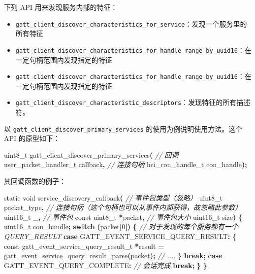 \documentclass[
  12pt,
]{book}
\newenvironment{Shaded}{\begin{snugshade}}{\end{snugshade}}
\newcommand{\CommentTok}[1]{\textcolor[rgb]{0.56,0.35,0.01}{\textit{#1}}}
\newcommand{\ControlFlowTok}[1]{\textcolor[rgb]{0.13,0.29,0.53}{\textbf{#1}}}
\newcommand{\DataTypeTok}[1]{\textcolor[rgb]{0.13,0.29,0.53}{#1}}
\newcommand{\DecValTok}[1]{\textcolor[rgb]{0.00,0.00,0.81}{#1}}
\newcommand{\NormalTok}[1]{#1}
\newcommand{\OperatorTok}[1]{\textcolor[rgb]{0.81,0.36,0.00}{\textbf{#1}}}
\begin{document}
下列 API 用来发现服务内部的特征：

\begin{itemize}
\item
  \texttt{gatt\_client\_discover\_characteristics\_for\_service}：发现一个服务里的所有特征
\item
  \texttt{gatt\_client\_discover\_characteristics\_for\_handle\_range\_by\_uuid16}：在一定句柄范围内发现指定的特征
\item
  \texttt{gatt\_client\_discover\_characteristics\_for\_handle\_range\_by\_uuid16}：在一定句柄范围内发现指定的特征
\item
  \texttt{gatt\_client\_discover\_characteristic\_descriptors}：发现特征的所有描述符。
\end{itemize}

以 \texttt{gatt\_client\_discover\_primary\_services} 的使用为例说明使用方法。这个 API 的原型如下：

\begin{Shaded}
\begin{Highlighting}[]
\DataTypeTok{uint8\_t}\NormalTok{ gatt\_client\_discover\_primary\_services}\OperatorTok{(}
  \CommentTok{// 回调}
\NormalTok{  user\_packet\_handler\_t callback}\OperatorTok{,}
  \CommentTok{// 连接句柄}
\NormalTok{  hci\_con\_handle\_t con\_handle}\OperatorTok{);}
\end{Highlighting}
\end{Shaded}

其回调函数的例子：

\begin{Shaded}
\begin{Highlighting}[]
\DataTypeTok{static} \DataTypeTok{void}\NormalTok{ service\_discovery\_callback}\OperatorTok{(}
  \CommentTok{// 事件包类型（忽略）}
  \DataTypeTok{uint8\_t}\NormalTok{ packet\_type}\OperatorTok{,}
  \CommentTok{// 连接句柄（这个句柄也可以从事件内部获得，故忽略此参数）}
  \DataTypeTok{uint16\_t}\NormalTok{ \_}\OperatorTok{,}
  \CommentTok{// 事件包}
  \DataTypeTok{const} \DataTypeTok{uint8\_t} \OperatorTok{*}\NormalTok{packet}\OperatorTok{,}
  \CommentTok{// 事件包大小}
  \DataTypeTok{uint16\_t}\NormalTok{ size}\OperatorTok{)}
\OperatorTok{\{}
    \DataTypeTok{uint16\_t}\NormalTok{ con\_handle}\OperatorTok{;}
    \ControlFlowTok{switch} \OperatorTok{(}\NormalTok{packet}\OperatorTok{[}\DecValTok{0}\OperatorTok{])}
    \OperatorTok{\{}
    \CommentTok{// 对于发现的每个服务都有一个 QUERY\_RESULT}
    \ControlFlowTok{case}\NormalTok{ GATT\_EVENT\_SERVICE\_QUERY\_RESULT}\OperatorTok{:}
        \OperatorTok{\{}
            \DataTypeTok{const}\NormalTok{ gatt\_event\_service\_query\_result\_t }\OperatorTok{*}\NormalTok{result }\OperatorTok{=}
\NormalTok{                gatt\_event\_service\_query\_result\_parse}\OperatorTok{(}\NormalTok{packet}\OperatorTok{);}
            \CommentTok{// ....}
        \OperatorTok{\}}
        \ControlFlowTok{break}\OperatorTok{;}
    \ControlFlowTok{case}\NormalTok{ GATT\_EVENT\_QUERY\_COMPLETE}\OperatorTok{:}
        \CommentTok{// 会话完成}
        \ControlFlowTok{break}\OperatorTok{;}
    \OperatorTok{\}}
\OperatorTok{\}}
\end{Highlighting}
\end{Shaded}
\end{document}
